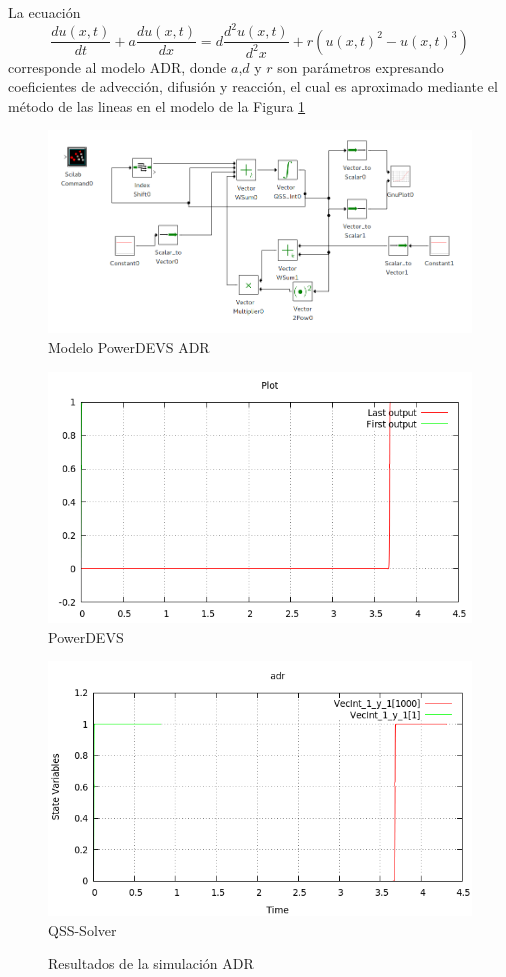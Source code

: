 La ecuación 
\begin{equation*}
\frac{du(x,t)}{dt} + a \frac{du(x,t)}{dx} = d\frac{d^2u(x,t)}{d^2x} + r(u(x,t)^2 - u(x,t)^3)
\end{equation*}
corresponde al modelo ADR, donde $a$,$d$ y $r$ son parámetros expresando coeficientes de advección, difusión y reacción, 
el cual es aproximado mediante el método de las lineas \cite{BKP13} en el modelo de la Figura \ref{model:adr}

\begin{figure}[H]
 \includegraphics[width=0.75\linewidth]{adr-pwd}
\caption{Modelo PowerDEVS ADR}\label{model:adr}
\end{figure}

\begin{figure}[H]
\begin{minipage}{0.5\textwidth}
 \includegraphics[width=\linewidth]{adr-pd}
\centering
PowerDEVS
\end{minipage}\hfill
\begin{minipage}{0.5\textwidth}
 \includegraphics[width=\linewidth]{adr-qss}
\centering
QSS-Solver
\end{minipage}
\caption{Resultados de la simulación ADR}\label{graph:adr}
\end{figure}


